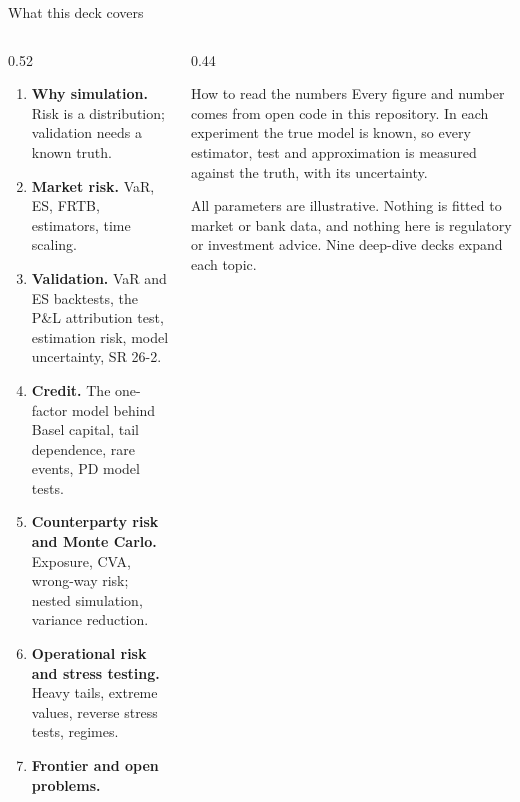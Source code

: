 \begin{frame}{What this deck covers}
  \begin{columns}[T]
    \begin{column}{0.52\textwidth}
      \footnotesize
      \begin{enumerate}
        \setlength{\itemsep}{0pt}
        \item \textbf{Why simulation.} Risk is a distribution; validation needs a known truth.
        \item \textbf{Market risk.} VaR, ES, FRTB, estimators, time scaling.
        \item \textbf{Validation.} VaR and ES backtests, the P\&L attribution test, estimation risk, model uncertainty, SR 26-2.
        \item \textbf{Credit.} The one-factor model behind Basel capital, tail dependence, rare events, PD model tests.
        \item \textbf{Counterparty risk and Monte Carlo.} Exposure, CVA, wrong-way risk; nested simulation, variance reduction.
        \item \textbf{Operational risk and stress testing.} Heavy tails, extreme values, reverse stress tests, regimes.
        \item \textbf{Frontier and open problems.}
      \end{enumerate}
    \end{column}
    \begin{column}{0.44\textwidth}
      \begin{alertblock}{How to read the numbers}
        Every figure and number comes from open code in this repository. In each experiment the true model is known, so every estimator, test and approximation is measured against the truth, with its uncertainty.
      \end{alertblock}
      \vspace{0.4em}
      {\small All parameters are illustrative. Nothing is fitted to market or bank data, and nothing here is regulatory or investment advice. Nine deep-dive decks expand each topic.}
    \end{column}
  \end{columns}
\end{frame}
